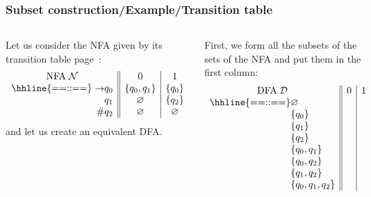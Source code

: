 % 
\begin{frame}
\frametitle{Subset construction/Example/Transition table}

\begin{columns}

   Let us consider the NFA given by its
  transition table page~\pageref{nfa_01_suffix_table}:
  \[
  \begin{array}{r@{}l||c|c}
    \multicolumn{2}{c||}{\text{NFA} \; {\cal N}} & 0 & 1\\
    \hhline{==::==}
    \rightarrow & q_0 & \{q_0, q_1\} & \{q_0\}\\
    & q_1 & \varnothing  & \{q_2\}\\
    \#          & q_2 & \varnothing  & \varnothing
  \end{array}
  \]
  and let us create an equivalent DFA. 

   First, we form all the subsets of the sets of
  the NFA and put them in the first column:
  \[
  \begin{array}{r@{}l||c|c}
    \multicolumn{2}{c||}{\text{DFA} \; {\cal D}} & 0 & 1\\
    \hhline{==::==}
    & \varnothing & &\\
    & \{q_0\}           & &\\
    & \{q_1\}           & &\\
    & \{q_2\}           & &\\
    & \{q_0, q_1\}      & &\\
    & \{q_0, q_2\}      & &\\
    & \{q_1, q_2\}      & &\\
    & \{q_0, q_1, q_2\} & &
  \end{array}
  \]
\end{columns}

\end{frame}


